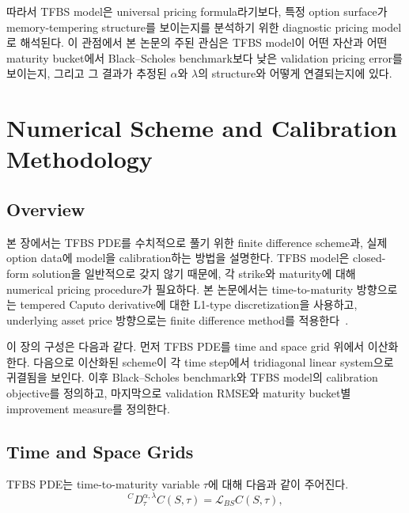 \documentclass[11pt,a4paper]{report}
\begin{document}
따라서 TFBS model은 universal pricing formula라기보다, 특정 option surface가 memory-tempering structure를 보이는지를 분석하기 위한 diagnostic pricing model로 해석된다. 이 관점에서 본 논문의 주된 관심은 TFBS model이 어떤 자산과 어떤 maturity bucket에서 Black--Scholes benchmark보다 낮은 validation pricing error를 보이는지, 그리고 그 결과가 추정된 $\alpha$와 $\lambda$의 structure와 어떻게 연결되는지에 있다.






















\chapter{Numerical Scheme and Calibration Methodology}

\section{Overview}

본 장에서는 TFBS PDE를 수치적으로 풀기 위한 finite difference scheme과, 실제 option data에 model을 calibration하는 방법을 설명한다. TFBS model은 closed-form solution을 일반적으로 갖지 않기 때문에, 각 strike와 maturity에 대해 numerical pricing procedure가 필요하다. 본 논문에서는 time-to-maturity 방향으로는 tempered Caputo derivative에 대한 L1-type discretization을 사용하고, underlying asset price 방향으로는 finite difference method를 적용한다~\cite{SabzikarMeerschaertChen2015}.

이 장의 구성은 다음과 같다. 먼저 TFBS PDE를 time and space grid 위에서 이산화한다. 다음으로 이산화된 scheme이 각 time step에서 tridiagonal linear system으로 귀결됨을 보인다. 이후 Black--Scholes benchmark와 TFBS model의 calibration objective를 정의하고, 마지막으로 validation RMSE와 maturity bucket별 improvement measure를 정의한다.

\section{Time and Space Grids}

TFBS PDE는 time-to-maturity variable $\tau$에 대해 다음과 같이 주어진다.
\[
{}^C D_\tau^{\alpha,\lambda} C(S,\tau)
=
\mathcal{L}_{BS}C(S,\tau),
\]
\end{document}
